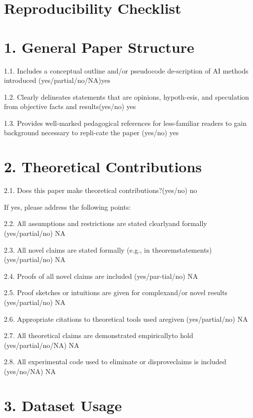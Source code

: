 \documentclass[
  10
]{article}
\begin{document}
\section{Reproducibility Checklist}\label{reproducibility-checklist}

\section{1. General Paper Structure}\label{general-paper-structure}

1.1. Includes a conceptual outline and/or pseudocode de-scription of AI
methods introduced (yes/partial/no/NA)yes

1.2. Clearly delineates statements that are opinions, hypoth-esis, and
speculation from objective facts and results(yes/no) yes

1.3. Provides well-marked pedagogical references for less-familiar
readers to gain background necessary to repli-cate the paper (yes/no)
yes

\section{2. Theoretical Contributions}\label{theoretical-contributions}

2.1. Does this paper make theoretical contributions?(yes/no) no

If yes, please address the following points:

2.2. All assumptions and restrictions are stated clearlyand formally
(yes/partial/no) NA

2.3. All novel claims are stated formally (e.g., in theoremstatements)
(yes/partial/no) NA

2.4. Proofs of all novel claims are included (yes/par-tial/no) NA

2.5. Proof sketches or intuitions are given for complexand/or novel
results (yes/partial/no) NA

2.6. Appropriate citations to theoretical tools used aregiven
(yes/partial/no) NA

2.7. All theoretical claims are demonstrated empiricallyto hold
(yes/partial/no/NA) NA

2.8. All experimental code used to eliminate or disproveclaims is
included (yes/no/NA) NA

\section{3. Dataset Usage}\label{dataset-usage}
\end{document}
